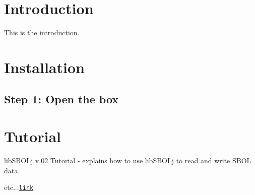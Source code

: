 \hypertarget{index_intro}{}\section{Introduction}\label{index_intro}
This is the introduction.\hypertarget{index_install_sec}{}\section{Installation}\label{index_install_sec}
\hypertarget{index_step1}{}\subsection{Step 1: Open the box}\label{index_step1}
\hypertarget{index_tutorial_sec}{}\section{Tutorial}\label{index_tutorial_sec}

\begin{DoxyItemize}
\item \hyperlink{tutorial}{libSBOLj v.02 Tutorial} -\/ explains how to use libSBOLj to read and write SBOL data

etc...\href{http://link.html}{\tt link} 
\end{DoxyItemize}